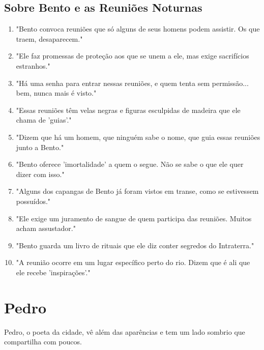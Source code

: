 \subsection*{Sobre Bento e as Reuniões Noturnas}
\begin{enumerate}
    \item "Bento convoca reuniões que só alguns de seus homens podem assistir. Os que traem, desaparecem."
    \item "Ele faz promessas de proteção aos que se unem a ele, mas exige sacrifícios estranhos."
    \item "Há uma senha para entrar nessas reuniões, e quem tenta sem permissão... bem, nunca mais é visto."
    \item "Essas reuniões têm velas negras e figuras esculpidas de madeira que ele chama de 'guias'."
    \item "Dizem que há um homem, que ninguém sabe o nome, que guia essas reuniões junto a Bento."
    \item "Bento oferece 'imortalidade' a quem o segue. Não se sabe o que ele quer dizer com isso."
    \item "Alguns dos capangas de Bento já foram vistos em transe, como se estivessem possuídos."
    \item "Ele exige um juramento de sangue de quem participa das reuniões. Muitos acham assustador."
    \item "Bento guarda um livro de rituais que ele diz conter segredos do Intraterra."
    \item "A reunião ocorre em um lugar específico perto do rio. Dizem que é ali que ele recebe 'inspirações'."
\end{enumerate}

\section{Pedro}
Pedro, o poeta da cidade, vê além das aparências e tem um lado sombrio que compartilha com poucos.

